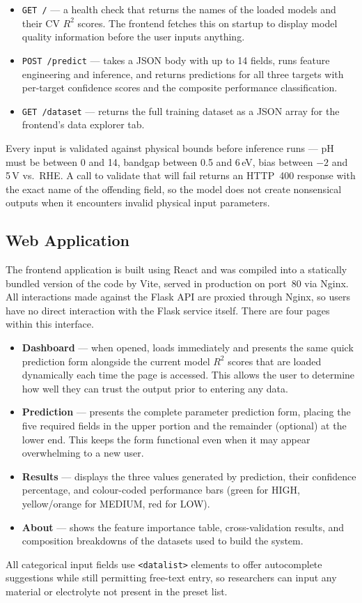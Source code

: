 \begin{itemize}
  \item \texttt{GET /} --- a health check that returns the names of the
        loaded models and their CV $R^2$ scores.
        The frontend fetches this on startup to display model quality
        information before the user inputs anything.

  \item \texttt{POST /predict} --- takes a JSON body with up to 14 fields,
        runs feature engineering and inference, and returns predictions for
        all three targets with per-target confidence scores and the composite
        performance classification.

  \item \texttt{GET /dataset} --- returns the full training dataset as a
        JSON array for the frontend's data explorer tab.
\end{itemize}

Every input is validated against physical bounds before inference runs ---
pH must be between 0 and 14, bandgap between 0.5 and 6\,eV,
bias between $-2$ and 5\,V vs.\ RHE.
A call to validate that will fail returns an HTTP~400 response with the exact
name of the offending field, so the model does not create nonsensical outputs
when it encounters invalid physical input parameters.

\subsection{Web Application}

The frontend application is built using React and was compiled into a statically
bundled version of the code by Vite, served in production on port~80 via Nginx.
All interactions made against the Flask API are proxied through Nginx, so users
have no direct interaction with the Flask service itself.
There are four pages within this interface.

\begin{itemize}
  \item \textbf{Dashboard} --- when opened, loads immediately and presents the
        same quick prediction form alongside the current model $R^2$ scores
        that are loaded dynamically each time the page is accessed.
        This allows the user to determine how well they can trust the output
        prior to entering any data.
  \item \textbf{Prediction} --- presents the complete parameter prediction form,
        placing the five required fields in the upper portion and the remainder
        (optional) at the lower end.
        This keeps the form functional even when it may appear overwhelming to
        a new user.
  \item \textbf{Results} --- displays the three values generated by prediction,
        their confidence percentage, and colour-coded performance bars
        (green for HIGH, yellow/orange for MEDIUM, red for LOW).
  \item \textbf{About} --- shows the feature importance table, cross-validation
        results, and composition breakdowns of the datasets used to build the
        system.
\end{itemize}

All categorical input fields use \texttt{<datalist>} elements to offer
autocomplete suggestions while still permitting free-text entry, so
researchers can input any material or electrolyte not present in the
preset list.
